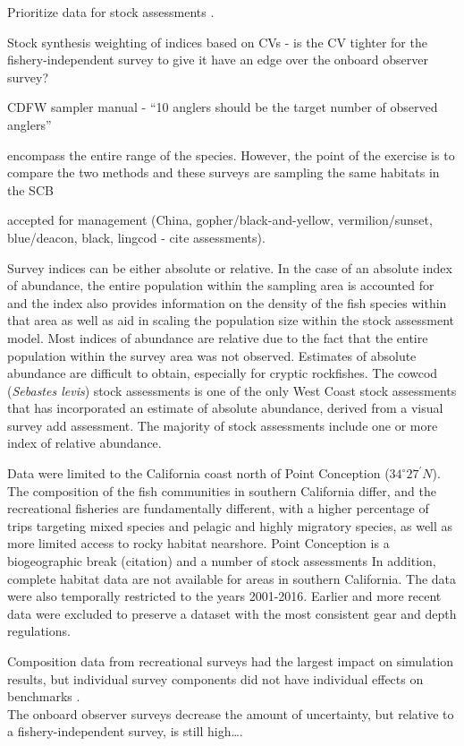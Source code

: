 \documentclass[
  authoryear,
  preprint,
  3p]{elsarticle}
\begin{document}
Prioritize data for stock assessments \citep{Magnusson:2007:WMF}.

Stock synthesis weighting of indices based on CVs - is the CV tighter
for the fishery-independent survey to give it have an edge over the
onboard observer survey?

CDFW sampler manual - ``10 anglers should be the target number of
observed anglers''

encompass the entire range of the species. However, the point of the
exercise is to compare the two methods and these surveys are sampling
the same habitats in the SCB

accepted for management (China, gopher/black-and-yellow,
vermilion/sunset, blue/deacon, black, lingcod - cite assessments).

Survey indices can be either absolute or relative. In the case of an
absolute index of abundance, the entire population within the sampling
area is accounted for and the index also provides information on the
density of the fish species within that area as well as aid in scaling
the population size within the stock assessment model. Most indices of
abundance are relative due to the fact that the entire population within
the survey area was not observed. Estimates of absolute abundance are
difficult to obtain, especially for cryptic rockfishes. The cowcod
(\emph{Sebastes levis}) stock assessments is one of the only West Coast
stock assessments that has incorporated an estimate of absolute
abundance, derived from a visual survey \citep{Love:2009:DFA} add
assessment. The majority of stock assessments include one or more index
of relative abundance.

Data were limited to the California coast north of Point Conception
(\(34^\circ 27^\prime N\)). The composition of the fish communities in
southern California differ, and the recreational fisheries are
fundamentally different, with a higher percentage of trips targeting
mixed species and pelagic and highly migratory species, as well as more
limited access to rocky habitat nearshore. Point Conception is a
biogeographic break (citation) and a number of stock assessments In
addition, complete habitat data are not available for areas in southern
California. The data were also temporally restricted to the years
2001-2016. Earlier and more recent data were excluded to preserve a
dataset with the most consistent gear and depth regulations.

Composition data from recreational surveys had the largest impact on
simulation results, but individual survey components did not have
individual effects on benchmarks \citep{Siegfried:2016:ISA}.\\
The onboard observer surveys decrease the amount of uncertainty, but
relative to a fishery-independent survey, is still high\ldots.
\end{document}
